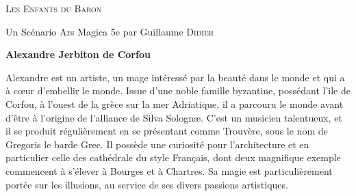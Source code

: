 

\begin{center}
\vfill
    {\Large\scshape Les Enfants du Baron\par}
    \vspace{0.5cm}
{Un Scénario Ars Magica 5e par Guillaume \textsc{Didier}\par}
    \vfill
    {\LARGE\bfseries Alexandre Jerbiton de Corfou\par}



\vfill
    \begin{center}
        \parbox{.8\textwidth}{
            Alexandre est un artiste, un mage intéressé par la beauté dans le monde et qui a à cœur d'embellir le monde. Issue d'une noble famille byzantine, possédant l'ile de Corfou, à l'ouest de la grèce sur la mer Adriatique, il a parcouru le monde avant d'être à l'origine de l'alliance de Silva Solognæ. C'est un musicien talentueux, et il se produit régulièrement en se présentant comme Trouvère, sous le nom de Gregoris le barde Grec. Il possède une curiosité pour l'architecture et en particulier celle des cathédrale du style Français, dont deux magnifique exemple commencent à s'élever à Bourges et à Chartres. Sa magie est particulièrement portée sur les illusions, au service de ses divers passions artistiques.}
    \end{center}
\vfill
\end{center}
\pagebreak

\shortsheet{}



